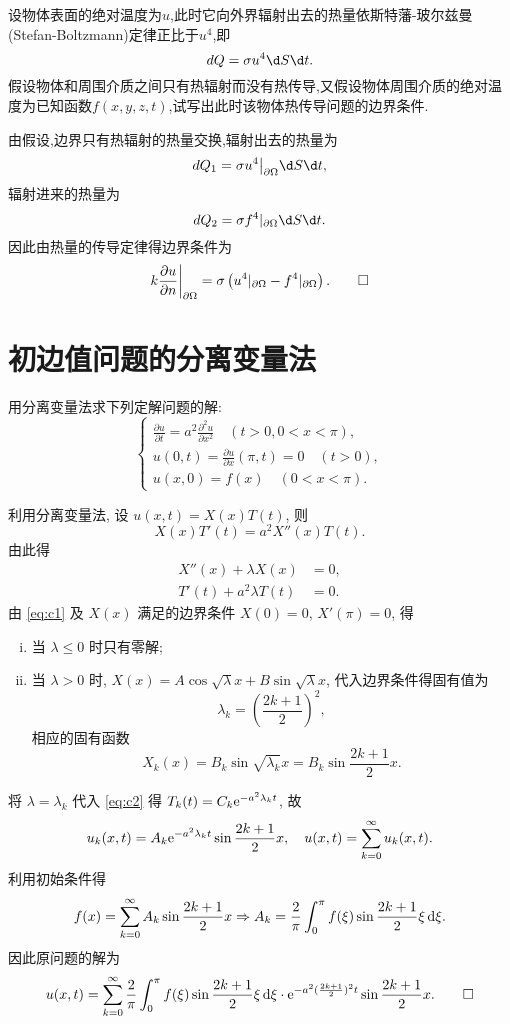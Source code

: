 \begin{exercise}[5]
	设物体表面的绝对温度为$u$,此时它向外界辐射出去的热量依斯特藩-玻尔兹曼(Stefan-Boltzmann)定律正比于$u^4$,即
	$$dQ=\sigma u^4\d S\d t.$$
	假设物体和周围介质之间只有热辐射而没有热传导,又假设物体周围介质的绝对温度为已知函数$f(x,y,z,t)$,试写出此时该物体热传导问题的边界条件.
\end{exercise}

\begin{solve}
	由假设,边界只有热辐射的热量交换,辐射出去的热量为
	$$dQ_1=\sigma u^4\big|_{\partial\Omega}\d S\d t,$$
	辐射进来的热量为
	$$dQ_2=\sigma f^4|_{\partial\Omega}\d S\d t.$$
	因此由热量的传导定律得边界条件为
	\[k\frac{\partial u}{\partial n}\bigg|_{\partial\Omega}=\sigma\left(u^4|_{\partial\Omega}-f^4|_{\partial\Omega}\right).\qedhere\]
\end{solve}
\section{初边值问题的分离变量法}


\begin{exercise}
  用分离变量法求下列定解问题的解:
  \[\begin{cases}
    \frac{\partial u}{\partial t} = a^2 \frac{\partial^2u}{\partial x^2}
      \quad (t>0, 0<x<\pi), \\
    u(0,t) = \frac{\partial u}{\partial x}(\pi,t) = 0\quad (t>0), \\
    u(x,0) = f(x)\quad (0<x<\pi).
  \end{cases}\]
\end{exercise}

\begin{solution}
  利用分离变量法, 设 $u(x,t)=X(x)T(t)$, 则
  \[X(x)T'(t) = a^2X''(x)T(t).\]
  由此得
  \begin{align}
    X''(x)+\lambda X(x) & = 0, \label{eq:c1} \\
    T'(t)+a^2\lambda T(t) & = 0. \label{eq:c2} 
  \end{align}
  由 \eqref{eq:c1} 及 $X(x)$ 满足的边界条件 $X(0)=0$, $X'(\pi)=0$, 得
  \begin{enumerate}[(i)]
    \item 当 $\lambda\leq 0$ 时只有零解;
    \item 当 $\lambda>0$ 时, $X(x)=A\cos\sqrt{\lambda}x+B\sin\sqrt{\lambda}x$,
      代入边界条件得固有值为 $$\lambda_k=\left(\frac{2k+1}{2}\right)^2,$$
      相应的固有函数 $$X_k(x)=B_k\sin\sqrt{\lambda_k}x=B_k\sin\frac{2k+1}{2}x.$$
  \end{enumerate}
  将 $\lambda=\lambda_k$ 代入 \eqref{eq:c2} 得 $T_k(t)=C_k\mathrm{e}^{-a^2\lambda_kt}$, 故
  \[u_k(x,t) = A_k\mathrm{e}^{-a^2\lambda_kt}\sin\frac{2k+1}{2}x,\quad u(x,t)
    = \sum_{k=0}^{\infty}u_k(x,t).\]
  利用初始条件得
  \[f(x) = \sum_{k=0}^{\infty}A_k\sin\frac{2k+1}{2}x\Rightarrow A_k
    = \frac{2}{\pi}\int_0^{\pi}f(\xi)\sin\frac{2k+1}{2}\xi\mathop{}\!\mathrm{d}\xi.\]
  因此原问题的解为
  \[u(x,t) = \sum_{k=0}^{\infty}\frac{2}{\pi}\int_0^{\pi} f(\xi)\sin\frac{2k+1}{2}
    \xi\mathop{}\!\mathrm{d}\xi\cdot \mathrm{e}^{-a^2(\frac{2k+1}2)^2t}\sin\frac{2k+1}{2}x. \qedhere\]
\end{solution}


